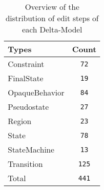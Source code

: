 \begin{table} 
 \center 
 \small 
\begin{tabular}{|l|c|}
\hline
Types & Count\\ 
  \hline 
Constraint & \texttt{72}\\ 
  \hline 
FinalState & \texttt{19}\\ 
  \hline 
OpaqueBehavior & \texttt{84}\\ 
  \hline 
Pseudostate & \texttt{27}\\ 
  \hline 
Region & \texttt{23}\\ 
  \hline 
State & \texttt{78}\\ 
  \hline 
StateMachine & \texttt{13}\\ 
  \hline 
Transition & \texttt{125}\\ 
  \hline 
Total & \texttt{441}\\ 
  \hline 
\end{tabular}
\caption[Overview: Delta-Models]{Overview of the distribution of edit steps of each Delta-Model}
\end{table}

